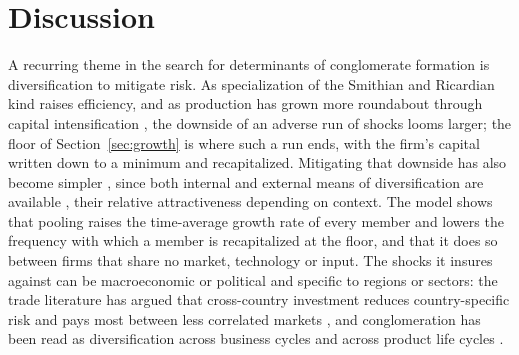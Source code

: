 \section{Discussion}
\label{sec:Discussion}

A recurring theme in the search for determinants of conglomerate formation is diversification to mitigate risk. As specialization of the Smithian \parencite{smith1776inquiry} and Ricardian \parencite{ricardo1817principles} kind raises efficiency, and as production has grown more roundabout through capital intensification \parencite{bawerk1921kapital}, the downside of an adverse run of shocks looms larger; the floor of Section~\ref{sec:growth} is where such a run ends, with the firm's capital written down to a minimum and recapitalized. Mitigating that downside has also become simpler \parencite{felton1971conglomerate}, since both internal and external means of diversification are available \parencite{goldberg1973effect}, their relative attractiveness depending on context. The model shows that pooling raises the time-average growth rate of every member and lowers the frequency with which a member is recapitalized at the floor, and that it does so between firms that share no market, technology or input. The shocks it insures against can be macroeconomic or political and specific to regions or sectors: the trade literature has argued that cross-country investment reduces country-specific risk and pays most between less correlated markets \parencite{ramondo2010role, ramondo2013proximity}, and conglomeration has been read as diversification across business cycles \parencite{amit1988concept} and across product life cycles \parencite{audretsch1989determinants}.

